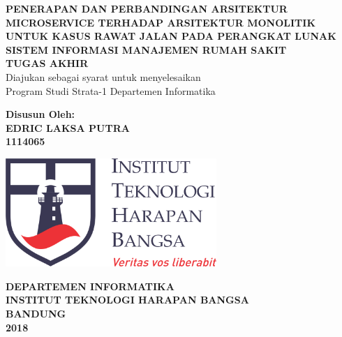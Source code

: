 \begin{titlepage}
\begin{center}
	\onehalfspacing
	{\large \bfseries PENERAPAN DAN PERBANDINGAN ARSITEKTUR MICROSERVICE TERHADAP ARSITEKTUR MONOLITIK UNTUK KASUS RAWAT JALAN PADA PERANGKAT LUNAK SISTEM INFORMASI MANAJEMEN RUMAH SAKIT\\
	\vspace{1.5cm}
	 \large TUGAS AKHIR}\\
           Diajukan sebagai syarat untuk menyelesaikan\\ Program Studi Strata-1 Departemen Informatika

	\vspace{1.5cm}
          {\bfseries Disusun Oleh: \\
           EDRIC LAKSA PUTRA \\
	1114065}
	
	\vspace{1.5cm}
	\includegraphics[width=8cm]{images/ithb.jpg}
	
	
	\vspace{3.5cm}
	
{\large \bfseries DEPARTEMEN INFORMATIKA \\
INSTITUT TEKNOLOGI HARAPAN BANGSA \\
BANDUNG\\
2018}

	
\end{center}

\end{titlepage}

\newpage